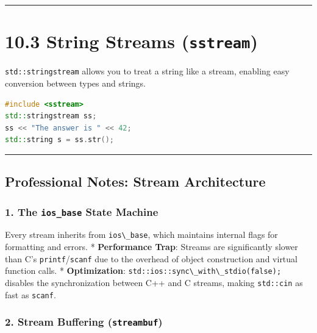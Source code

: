 \begin{center}\rule{0.5\linewidth}{0.5pt}\end{center}

\hypertarget{string-streams-sstream}{%
\section{\texorpdfstring{10.3 String Streams
(\texttt{sstream})}{10.3 String Streams (sstream)}}\label{string-streams-sstream}}

\passthrough{\lstinline!std::stringstream!} allows you to treat a string
like a stream, enabling easy conversion between types and strings.

\begin{lstlisting}[language={C++}]
#include <sstream>
std::stringstream ss;
ss << "The answer is " << 42;
std::string s = ss.str();
\end{lstlisting}

\begin{center}\rule{0.5\linewidth}{0.5pt}\end{center}

\hypertarget{professional-notes-stream-architecture}{%
\subsection{Professional Notes: Stream
Architecture}\label{professional-notes-stream-architecture}}

\hypertarget{the-ios_base-state-machine}{%
\subsubsection{\texorpdfstring{1. The \texttt{ios\_base} State
Machine}{1. The ios\_base State Machine}}\label{the-ios_base-state-machine}}

Every stream inherits from \passthrough{\lstinline!ios\_base!}, which
maintains internal flags for formatting and errors. *
\textbf{Performance Trap}: Streams are significantly slower than C's
\passthrough{\lstinline!printf!}/\passthrough{\lstinline!scanf!} due to
the overhead of object construction and virtual function calls. *
\textbf{Optimization}:
\passthrough{\lstinline!std::ios::sync\_with\_stdio(false);!} disables
the synchronization between C++ and C streams, making
\passthrough{\lstinline!std::cin!} as fast as
\passthrough{\lstinline!scanf!}.

\hypertarget{stream-buffering-streambuf}{%
\subsubsection{\texorpdfstring{2. Stream Buffering
(\texttt{streambuf})}{2. Stream Buffering (streambuf)}}\label{stream-buffering-streambuf}}

